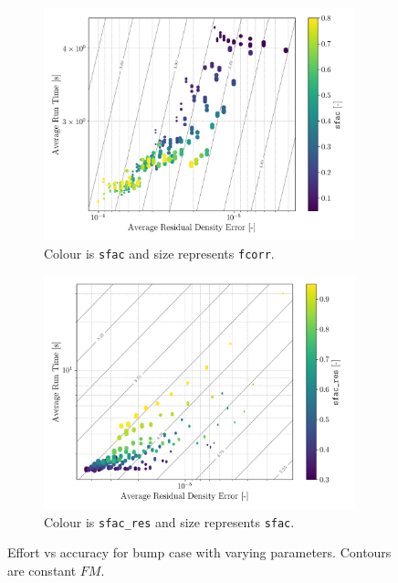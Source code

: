 \documentclass{article}
\begin{document}
\begin{figure}[H]
    \begin{subfigure}{0.49\textwidth}
        \centering
        \includegraphics[width=0.99\textwidth]{figures/effort_vs_accuracy_fcorr.png}
        \caption{Colour is \texttt{sfac} and size represents \texttt{fcorr}.}
        \label{fig:effort_vs_accuracy_fcorr}
    \end{subfigure}
    \begin{subfigure}{0.49\textwidth}
        \centering
        \includegraphics[width=0.99\textwidth]{figures/effort_vs_accuracy_sfac_res.png}
        \caption{Colour is \texttt{sfac\_res} and size represents \texttt{sfac}.}
        \label{fig:effort_vs_accuracy_sfac_res}
    \end{subfigure}
    \caption{Effort vs accuracy for bump case with varying parameters. Contours are constant $FM$.}
    \label{fig:effort_vs_accuracy_2}
\end{figure}
\end{document}
